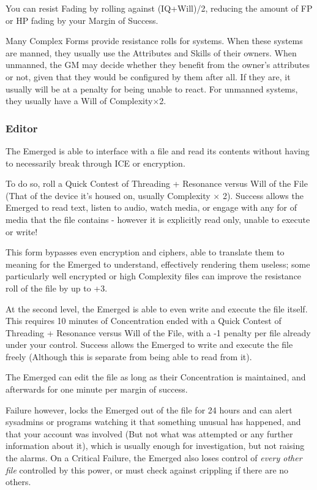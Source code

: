 \begin{multicols*}{3}
	You can resist Fading by rolling against (IQ+Will)/2, reducing the amount of FP or HP fading by your Margin of Success.
	
	Many Complex Forms provide resistance rolls for systems. When these systems are manned, they usually use the Attributes and Skills of their owners. When unmanned, the GM may decide whether they benefit from the owner's attributes or not, given that they would be configured by them after all. If they are, it usually will be at a penalty for being unable to react. For unmanned systems, they usually have a Will of Complexity\(\times\)2.
	
	\subsubsection*{Editor}\label{editor}
	
	The Emerged is able to interface with a file and read its contents without having to necessarily break through ICE or encryption.
	
	To do so, roll a Quick Contest of Threading + Resonance versus Will of the File (That of the device it's housed on, usually Complexity $\times$ 2). Success allows the Emerged to read text, listen to audio, watch media, or engage with any for of media that the file contains - however it is explicitly read only, unable to execute or write!
	
	This form bypasses even encryption and ciphers, able to translate them to meaning for the Emerged to understand, effectively rendering them useless; some particularly well encrypted or high Complexity files can improve the resistance roll of the file by up to +3.
	
	At the second level, the Emerged is able to even write and execute the file itself. This requires 10 minutes of Concentration ended with a Quick Contest of Threading + Resonance versus Will of the File, with a -1 penalty per file already under your control. Success allows the Emerged to write and execute the file freely (Although this is separate from being able to read from it).
	
	The Emerged can edit the file as long as their Concentration is maintained, and afterwards for one minute per margin of success.
	
	Failure however, locks the Emerged out of the file for 24 hours and can alert sysadmins or programs watching it that something unusual has happened, and that your account was involved (But not what was attempted or any further information about it), which is usually enough for investigation, but not raising the alarms. On a Critical Failure, the Emerged also loses control of \textit{every other file} controlled by this power, or must check against crippling if there are no others.
	

\end{multicols*}
